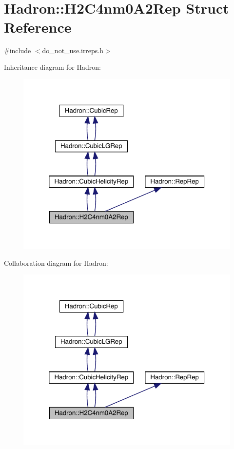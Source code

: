 \hypertarget{structHadron_1_1H2C4nm0A2Rep}{}\section{Hadron\+:\+:H2\+C4nm0\+A2\+Rep Struct Reference}
\label{structHadron_1_1H2C4nm0A2Rep}


{\ttfamily \#include $<$do\+\_\+not\+\_\+use.\+irreps.\+h$>$}



Inheritance diagram for Hadron\+:\nopagebreak
\begin{figure}[H]
\begin{center}
\leavevmode
\includegraphics[width=320pt]{da/da3/structHadron_1_1H2C4nm0A2Rep__inherit__graph}
\end{center}
\end{figure}


Collaboration diagram for Hadron\+:\nopagebreak
\begin{figure}[H]
\begin{center}
\leavevmode
\includegraphics[width=320pt]{df/dc6/structHadron_1_1H2C4nm0A2Rep__coll__graph}
\end{center}
\end{figure}
